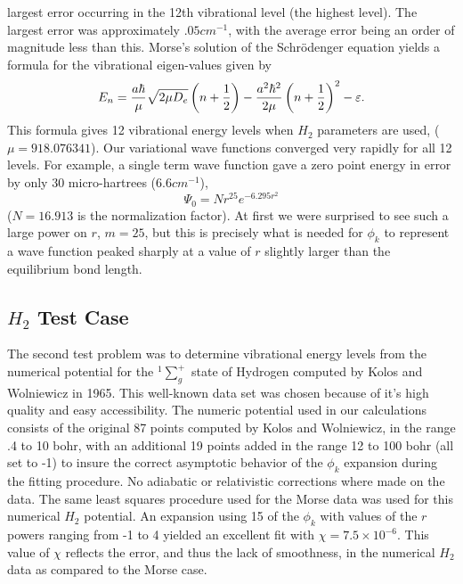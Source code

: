 largest error occurring in the 12th vibrational level (the highest level).
The largest error was approximately $.05cm^{-1}$, with the average error
being an order of magnitude less than this. Morse's solution of the
Schr\"{o}denger equation yields a formula for the vibrational eigen-values
given by 
\begin{equation}
E_n=\frac{a\hbar }\mu \sqrt{2\mu D_e}\left( n+\frac 12\right) -\frac{%
a^2\hbar ^2}{2\mu }\left( n+\frac 12\right) ^2-\varepsilon .
\end{equation}
This formula gives 12 vibrational energy levels when $H_2$ parameters are
used, ($\mu =918.076341$). Our variational wave functions converged very
rapidly for all 12 levels. For example, a single term wave function gave a
zero point energy in error by only 30 micro-hartrees (6.6$cm^{-1}$), 
\begin{equation}
\Psi _0=Nr^{25}e^{-6.295r^2}
\end{equation}
($N=16.913$ is the normalization factor). At first we were surprised to see
such a large power on $r$, $m=25$, but this is precisely what is needed for $%
\phi _k$ to represent a wave function peaked sharply at a value of $r$
slightly larger than the equilibrium bond length.

\subsection{$H_2$ Test Case}

The second test problem was to determine vibrational energy levels from the
numerical potential for the $^1\sum_g^{+}$ state of Hydrogen computed by
Kolos and Wolniewicz in 1965\cite{Kolos65}. This well-known data set was
chosen because of it's high quality and easy accessibility. The numeric
potential used in our calculations consists of the original 87 points
computed by Kolos and Wolniewicz, in the range .4 to 10 bohr, with an
additional 19 points added in the range 12 to 100 bohr (all set to -1) to
insure the correct asymptotic behavior of the $\phi _k$ expansion during the
fitting procedure. No adiabatic or relativistic corrections where made on
the data. The same least squares procedure used for the Morse data was used
for this numerical $H_2$ potential. An expansion using 15 of the $\phi _k$
with values of the $r$ powers ranging from -1 to 4 yielded an excellent fit
with $\chi =7.5\times 10^{-6}.$ This value of $\chi $ reflects the error,
and thus the lack of smoothness, in the numerical $H_2$ data as compared to
the Morse case.

